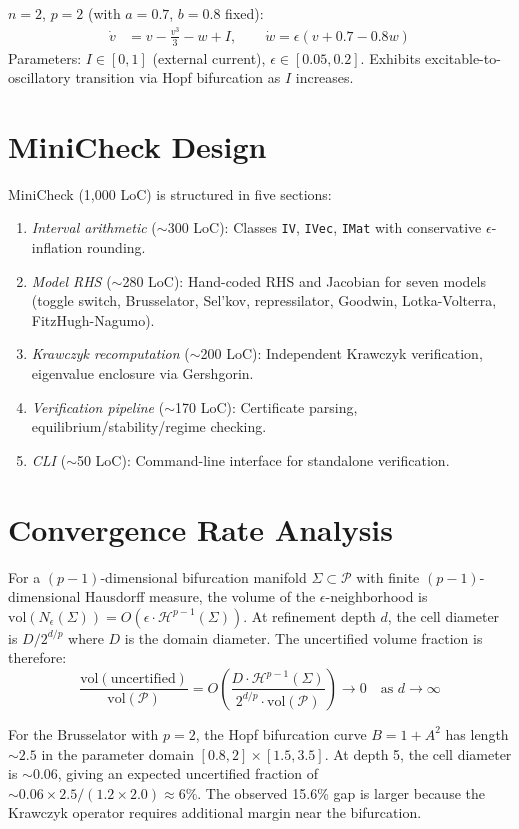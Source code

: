 \documentclass[11pt]{article}
\begin{document}
$n=2$, $p=2$ (with $a{=}0.7$, $b{=}0.8$ fixed):
\begin{align*}
\dot{v} &= v - \tfrac{v^3}{3} - w + I, \qquad
\dot{w} = \epsilon(v + 0.7 - 0.8w)
\end{align*}
Parameters: $I \in [0, 1]$ (external current), $\epsilon \in [0.05, 0.2]$.
Exhibits excitable-to-oscillatory transition via Hopf bifurcation as $I$ increases.

\section{MiniCheck Design}
\label{app:minicheck}

MiniCheck (1,000 LoC) is structured in five sections:
\begin{enumerate}
\item \emph{Interval arithmetic} ($\sim$300 LoC): Classes \texttt{IV}, \texttt{IVec}, \texttt{IMat} with conservative $\epsilon$-inflation rounding.
\item \emph{Model RHS} ($\sim$280 LoC): Hand-coded RHS and Jacobian for seven models (toggle switch, Brusselator, Sel'kov, repressilator, Goodwin, Lotka-Volterra, FitzHugh-Nagumo).
\item \emph{Krawczyk recomputation} ($\sim$200 LoC): Independent Krawczyk verification, eigenvalue enclosure via Gershgorin.
\item \emph{Verification pipeline} ($\sim$170 LoC): Certificate parsing, equilibrium/stability/regime checking.
\item \emph{CLI} ($\sim$50 LoC): Command-line interface for standalone verification.
\end{enumerate}

\section{Convergence Rate Analysis}
\label{app:convergence}

For a $(p{-}1)$-dimensional bifurcation manifold $\Sigma \subset \mathcal{P}$ with finite $(p{-}1)$-dimensional Hausdorff measure, the volume of the $\epsilon$-neighborhood is $\mathrm{vol}(N_\epsilon(\Sigma)) = O(\epsilon \cdot \mathcal{H}^{p-1}(\Sigma))$.
At refinement depth $d$, the cell diameter is $D/2^{d/p}$ where $D$ is the domain diameter.
The uncertified volume fraction is therefore:
\[
\frac{\mathrm{vol}(\text{uncertified})}{\mathrm{vol}(\mathcal{P})} = O\!\left(\frac{D \cdot \mathcal{H}^{p-1}(\Sigma)}{2^{d/p} \cdot \mathrm{vol}(\mathcal{P})}\right) \to 0 \quad \text{as } d \to \infty
\]

For the Brusselator with $p=2$, the Hopf bifurcation curve $B = 1 + A^2$ has length $\sim 2.5$ in the parameter domain $[0.8, 2] \times [1.5, 3.5]$.
At depth 5, the cell diameter is $\sim 0.06$, giving an expected uncertified fraction of $\sim 0.06 \times 2.5 / (1.2 \times 2.0) \approx 6\%$.
The observed 15.6\% gap is larger because the Krawczyk operator requires additional margin near the bifurcation.
\end{document}
